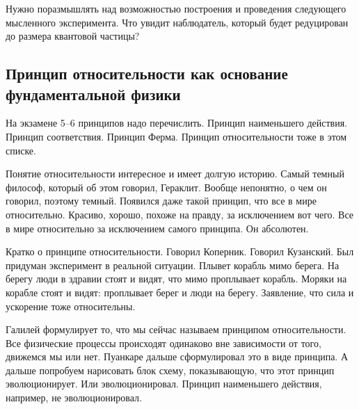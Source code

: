 \documentclass[a4paper, 12pt]{article}
\begin{document}
Нужно поразмышлять над возможностью построения и проведения следующего 
мысленного эксперимента. Что увидит наблюдатель, который будет 
редуцирован до размера квантовой частицы?


\subsection{Принцип относительности как основание фундаментальной 
            физики}

На экзамене 5--6 принципов надо перечислить. Принцип наименьшего 
действия. Принцип соответствия. Принцип Ферма. Принцип относительности 
тоже в этом списке.

Понятие относительности интересное и имеет долгую историю. Самый темный 
философ, который об этом говорил, Гераклит. Вообще непонятно, о чем он 
говорил, поэтому темный. Появился даже такой принцип, что все в мире 
относительно. Красиво, хорошо, похоже на правду, за исключением вот 
чего. Все в мире относительно за исключением самого принципа. Он 
абсолютен.

Кратко о принципе относительности. Говорил Коперник. Говорил Кузанский. 
Был придуман эксперимент в реальной ситуации. Плывет корабль мимо 
берега. На берегу люди в здравии стоят и видят, что мимо проплывает 
корабль. Моряки на корабле стоят и видят: проплывает берег и люди на 
берегу. Заявление, что сила и ускорение тоже относительны.

Галилей формулирует то, что мы сейчас называем принципом 
относительности. Все физические процессы происходят одинаково вне 
зависимости от того, движемся мы или нет. Пуанкаре дальше сформулировал 
это в виде принципа. А дальше попробуем нарисовать блок схему, 
показывающую, что этот принцип эволюционирует. Или эволюционировал. 
Принцип наименьшего действия, например, не эволюционировал.
\end{document}
